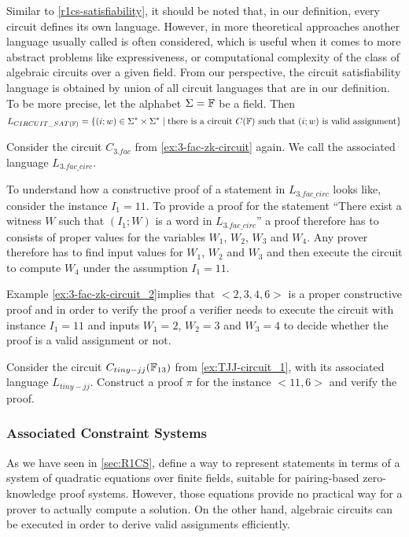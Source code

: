\begin{remark} Similar to \ref{r1cs-satisfiability}, it should be noted that, in our definition, every circuit defines its own language. However, in more theoretical approaches another language usually called  is often considered, which is useful when it comes to more abstract problems like expressiveness, or computational complexity of the class of  algebraic circuits over a given field. From our perspective, the circuit satisfiability language is obtained by union of all circuit languages that are in our definition. To be more precise, let the alphabet $\Sigma=\mathbb{F}$ be a field. Then 
$$
L_{CIRCUIT\_SAT(\mathbb{F})} = \{(i;w)\in \Sigma^*\times \Sigma^*\;|\; \text{there is a circuit } C(\mathbb{F}) \text{ such that } (i;w) \text{ is valid assignment}\}
$$
\end{remark}
\begin{example}[3-Factorization]Consider the circuit $C_{3.fac}$ from \examplename{} \ref{ex:3-fac-zk-circuit} again. We call the associated language $L_{3.fac\_circ}$.

To understand how a constructive proof of a statement in $L_{3.fac\_circ}$ looks like, consider the instance $I_1= 11$. To provide a proof for the statement ``There exist a witness $W$ such that $(I_1;W)$ is a word in $L_{3.fac\_circ}$'' a proof therefore has to consists of proper values for the variables $W_1$, $W_2$, $W_3$ and $W_4$. Any prover therefore has to find input values for $W_1$, $W_2$ and $W_3$ and then execute the circuit to compute $W_4$ under the assumption $I_1=11$. 

Example \ref{ex:3-fac-zk-circuit_2}implies that $<2,3,4,6>$ is a proper constructive proof and in order to verify the proof a verifier needs to execute the circuit with instance $I_1=11$ and inputs $W_1=2$, $W_2=3$ and $W_3=4$ to decide whether the proof is a valid assignment or not. 
\end{example}
\begin{exercise}
Consider the circuit $C_{tiny-jj}(\mathbb{F}_{13})$ from \examplename{} \ref{ex:TJJ-circuit_1}, with its associated language $L_{tiny-jj}$. Construct a proof $\pi$ for the instance $<11,6>$ and verify the proof.
\end{exercise}

\subsubsection{Associated Constraint Systems}
\label{sec:circuits_associated_R1CS} As we have seen in \ref{sec:R1CS},  define a way to represent statements in terms of a system of quadratic equations over finite fields, suitable for pairing-based zero-knowledge proof systems. However,  those equations provide no practical way for a prover to actually compute a solution. On the other hand, algebraic circuits can be executed in order to derive valid assignments efficiently. 

